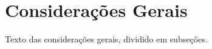 \chapter{Considerações Gerais}
\label{cap:02}

Texto das considerações gerais, dividido em subseções.






%
%


% 






